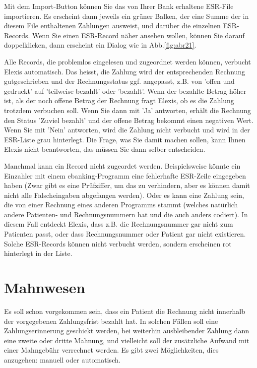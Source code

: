 \documentclass[a4paper]{scrartcl}
\begin{document}
Mit dem Import-Button können Sie das von Ihrer Bank erhaltene ESR-File importieren. Es erscheint dann jeweils ein grüner Balken, der eine Summe der in diesem File enthaltenen Zahlungen ausweist, und darüber die einzelnen ESR-Records. Wenn Sie einen ESR-Record näher ansehen wollen, können Sie darauf doppelklicken, dann erscheint ein Dialog wie in Abb.\ref{fig:abr21}.

\medskip

Alle Records, die problemlos eingelesen und zugeordnet werden können, verbucht Elexis automatisch. Das heisst, die Zahlung wird der entsprechenden Rechnung gutgeschrieben und der Rechnungsstatus ggf. angepasst, z.B. von 'offen und gedruckt' auf 'teilweise bezahlt' oder 'bezahlt'. Wenn der bezahlte Betrag höher ist, als der noch offene Betrag der Rechnung fragt Elexis, ob es die Zahlung trotzdem verbuchen soll. Wenn Sie dann mit 'Ja' antworten, erhält die Rechnung den Status 'Zuviel bezahlt' und der offene Betrag bekommt einen negativen Wert. Wenn Sie mit 'Nein' antworten, wird die Zahlung nicht verbucht und wird in der ESR-Liste grau hinterlegt. Die Frage, was Sie damit machen sollen, kann Ihnen Elexis nicht beantworten, das müssen Sie dann selber entscheiden.

\medskip

Manchmal kann ein Record nicht zugeordet werden. Beispielsweise könnte ein Einzahler mit einem ebanking-Programm eine fehlerhafte ESR-Zeile eingegeben haben (Zwar gibt es eine Prüfziffer, um das zu verhindern, aber es können damit nicht alle Falscheingaben abgefangen werden). Oder es kann eine Zahlung sein, die von einer Rechnung eines anderen Programms stammt (welches natürlich andere Patienten- und Rechnungsnummern hat und die auch anders codiert). In diesem Fall entdeckt Elexis, dass z.B. die Rechnungsnummer gar nicht zum Patienten passt, oder dass Rechnungsnummer oder Patient gar nicht existieren. Solche ESR-Records können nicht verbucht werden, sondern erscheinen rot hinterlegt in der Liste.

\section{Mahnwesen}
Es soll schon vorgekommen sein, dass ein Patient die Rechnung nicht innerhalb der vorgegebenen Zahlungsfrist bezahlt hat. In solchen Fällen soll eine Zahlungserinnerung geschickt werden, bei weiterhin ausbleibender Zahlung dann eine zweite oder dritte Mahnung, und vielleicht soll der zusätzliche Aufwand mit einer Mahngebühr verrechnet werden. Es gibt zwei Möglichkeiten, dies anzugehen: manuell oder automatisch.
\end{document}
